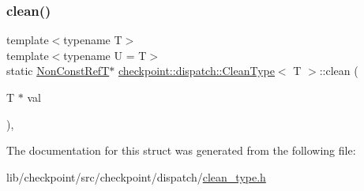 \mbox{\label{structcheckpoint_1_1dispatch_1_1_clean_type_a3cae7a0e99d5ad8455d449b564a6e420}} 
\subsubsection{\texorpdfstring{clean()}{clean()}}
{\footnotesize\ttfamily template$<$typename T$>$ \\
template$<$typename U  = T$>$ \\
static \hyperlink{structcheckpoint_1_1dispatch_1_1_clean_type_a22ac8ae19000187cd7d3d218f3efa46e}{Non\+Const\+RefT}$\ast$ \hyperlink{structcheckpoint_1_1dispatch_1_1_clean_type}{checkpoint\+::dispatch\+::\+Clean\+Type}$<$ T $>$\+::clean (\begin{DoxyParamCaption}\item[{T $\ast$}]{val }\end{DoxyParamCaption})\hspace{0.3cm}{\ttfamily [inline]}, {\ttfamily [static]}}



The documentation for this struct was generated from the following file\+:\begin{DoxyCompactItemize}
\item 
lib/checkpoint/src/checkpoint/dispatch/\hyperlink{clean__type_8h}{clean\+\_\+type.\+h}\end{DoxyCompactItemize}
